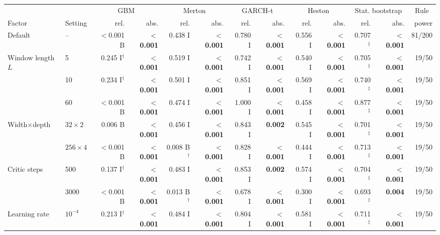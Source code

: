 \begin{tabular}{llrrrrrrrrrrr}
\toprule
 &  & \multicolumn{2}{c}{GBM} & \multicolumn{2}{c}{Merton} & \multicolumn{2}{c}{GARCH-t} & \multicolumn{2}{c}{Heston} & \multicolumn{2}{c}{Stat. bootstrap} & \multicolumn{1}{c}{Rule} \\
\cmidrule(lr){3-4} \cmidrule(lr){5-6} \cmidrule(lr){7-8} \cmidrule(lr){9-10} \cmidrule(lr){11-12} \cmidrule(lr){13-13}
Factor & Setting & rel. & abs. & rel. & abs. & rel. & abs. & rel. & abs. & rel. & abs. & power \\
\midrule
Default & -- & $<$0.001 B & \textbf{$<$0.001} & 0.438 I & \textbf{$<$0.001} & 0.780 I & \textbf{$<$0.001} & 0.556 I & \textbf{$<$0.001} & 0.707$^\ddagger$ & \textbf{$<$0.001} & 81/200 \\
Window length $L$ & 5 & 0.245 I$^\dagger$ & \textbf{$<$0.001} & 0.519 I & \textbf{$<$0.001} & 0.742 I & \textbf{$<$0.001} & 0.540 I & \textbf{$<$0.001} & 0.705$^\ddagger$ & \textbf{$<$0.001} & 19/50 \\
 & 10 & 0.234 I$^\dagger$ & \textbf{$<$0.001} & 0.501 I & \textbf{$<$0.001} & 0.851 I & \textbf{$<$0.001} & 0.569 I & \textbf{$<$0.001} & 0.740$^\ddagger$ & \textbf{$<$0.001} & 19/50 \\
 & 60 & $<$0.001 B & \textbf{$<$0.001} & 0.474 I & \textbf{$<$0.001} & 1.000 I & \textbf{$<$0.001} & 0.458 I & \textbf{$<$0.001} & 0.877$^\ddagger$ & \textbf{$<$0.001} & 19/50 \\
Width$\times$depth & $32\times2$ & 0.006 B & \textbf{$<$0.001} & 0.456 I & \textbf{$<$0.001} & 0.843 I & \textbf{0.002} & 0.545 I & \textbf{$<$0.001} & 0.701$^\ddagger$ & \textbf{$<$0.001} & 19/50 \\
 & $256\times4$ & $<$0.001 B & \textbf{$<$0.001} & 0.008 B$^\dagger$ & \textbf{$<$0.001} & 0.828 I & \textbf{$<$0.001} & 0.444 I & \textbf{$<$0.001} & 0.713$^\ddagger$ & \textbf{$<$0.001} & 19/50 \\
Critic steps & 500 & 0.137 I$^\dagger$ & \textbf{$<$0.001} & 0.483 I & \textbf{$<$0.001} & 0.853 I & \textbf{0.002} & 0.574 I & \textbf{$<$0.001} & 0.704$^\ddagger$ & \textbf{$<$0.001} & 19/50 \\
 & 3000 & $<$0.001 B & \textbf{$<$0.001} & 0.013 B$^\dagger$ & \textbf{$<$0.001} & 0.678 I & \textbf{$<$0.001} & 0.300 I & \textbf{$<$0.001} & 0.693$^\ddagger$ & \textbf{0.004} & 19/50 \\
Learning rate & $10^{-4}$ & 0.213 I$^\dagger$ & \textbf{$<$0.001} & 0.484 I & \textbf{$<$0.001} & 0.804 I & \textbf{$<$0.001} & 0.581 I & \textbf{$<$0.001} & 0.711$^\ddagger$ & \textbf{$<$0.001} & 19/50 \\

\end{tabular}
